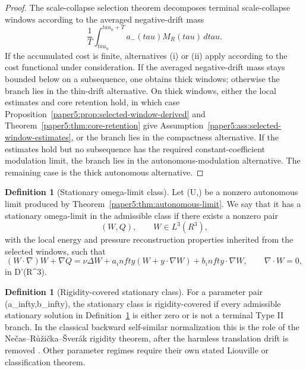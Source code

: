\documentclass[11pt]{amsart}
\def\({}%
\def\){}%
\def\mathbb#1{#1}%
\def\tau{tau}%
\def\infty{infty}%
\theoremstyle{plain}
\theoremstyle{definition}
\newtheorem{definition}[theorem]{Definition}
\theoremstyle{remark}
\begin{document}
\begin{proof}
The scale-collapse selection theorem decomposes terminal scale-collapse windows according to the
averaged negative-drift mass
\[
  \frac1T\int_{\tau_n}^{\tau_n+T}a_-(\tau)M_R(\tau)\,d\tau.
\]
If the accumulated cost is finite, alternatives (i) or (ii) apply according to the cost
functional under consideration.  If the averaged negative-drift mass stays bounded below on a
subsequence, one obtains thick windows; otherwise the branch lies in the thin-drift alternative.
On thick windows, either the local estimates and core retention hold, in which case
Proposition~\ref{paper5:prop:selected-window-derived} and Theorem~\ref{paper5:thm:core-retention} give
Assumption~\ref{paper5:ass:selected-window-estimates}, or the branch lies in the compactness alternative.  If
the estimates hold but no subsequence has the required constant-coefficient modulation limit,
the branch lies in the autonomous-modulation alternative.  The remaining case is the thick
autonomous alternative.
\end{proof}

\begin{definition}[Stationary omega-limit class]\label{paper5:def:stationary-omega-class}
Let \((U,\Pi)\) be a nonzero autonomous limit produced by
Theorem~\ref{paper5:thm:autonomous-limit}.  We say that it has a stationary omega-limit in the
admissible class if there exists a nonzero pair
\[
  (W,Q),\qquad W\in L^3(\mathbb R^3),
\]
with the local energy and pressure reconstruction properties inherited from the selected
windows, such that
\[
  (W\cdot\nabla)W+\nabla Q
  =
  \nu\Delta W+a_\infty(W+y\cdot\nabla W)+b_\infty\cdot\nabla W,
  \qquad
  \nabla\cdot W=0,
\]
in \(\mathcal D'(\mathbb R^3)\).
\end{definition}

\begin{definition}[Rigidity-covered stationary class]\label{paper5:def:rigidity-covered-class}
For a parameter pair \((a_\infty,b_\infty)\), the stationary class is rigidity-covered if every
admissible stationary solution in Definition~\ref{paper5:def:stationary-omega-class} is either zero or
is not a terminal Type II branch.  In the classical backward self-similar normalization this is
the role of the Nečas--Růžička--Šverák rigidity theorem, after the harmless translation drift is
removed \cite{NecasRuzickaSverak1996}.  Other parameter regimes require their own stated
Liouville or classification theorem.
\end{definition}
\end{document}
